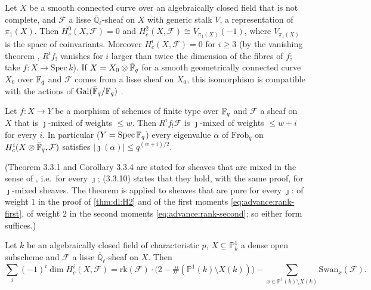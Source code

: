 \begin{theorem}\label{thm:prelim:curves}
Let $X$ be a smooth connected curve over an algebraically closed field that
is not complete, and $\mathcal F$ a lisse $\overline{\mathbb Q}_\ell$-sheaf on
$X$ with generic stalk $V$, a representation of $\pi_1(X)$. Then
$H^0_c(X,\mathcal F)=0$ and $H^2_c(X,\mathcal F)\cong V_{\pi_1(X)}(-1)$,
where $V_{\pi_1(X)}$ is the space of coinvariants. Moreover
$H^i_c(X,\mathcal F)=0$ for $i\ge3$ (by the vanishing theorem
\cite[Arcata, IV, Thm.~6.1]{SGA4half}, $R^if_!$ vanishes for $i$ larger than
twice the dimension of the fibres of $f$; take $f:X\to\mathrm{Spec}\,k$).
If $X=X_0\otimes\bar{\mathbb F}_q$ for a smooth geometrically connected curve $X_0$
over $\mathbb F_q$ and $\mathcal F$ comes from a lisse sheaf on $X_0$, this
isomorphism is compatible with the actions of $\mathrm{Gal}(\bar{\mathbb F}_q/\mathbb F_q)$
\cite[(1.4.2.3)]{DeligneWeilII}.
\end{theorem}

\begin{theorem}\label{thm:prelim:weights}
Let $f:X\to Y$ be a morphism of schemes of finite type over $\mathbb F_q$ and
$\mathcal F$ a sheaf on $X$ that is $\jmath$-mixed of weights $\le w$. Then
$R^if_!\mathcal F$ is $\jmath$-mixed of weights $\le w+i$ for every $i$. In
particular ($Y=\mathrm{Spec}\,\mathbb F_q$) every eigenvalue $\alpha$ of
$\mathrm{Frob}_q$ on $H^i_c(X\otimes\bar{\mathbb F}_q,\mathcal F)$ satisfies
$|\jmath(\alpha)|\le q^{(w+i)/2}$.
\end{theorem}

\noindent (Theorem 3.3.1 and Corollary 3.3.4 are stated for sheaves that are
mixed in the sense of \cite[(1.2.2)]{DeligneWeilII}, i.e.\ for every
$\jmath$; (3.3.10) states that they hold, with the same proof, for
$\jmath$-mixed sheaves. The theorem is applied to sheaves that are pure for
every $\jmath$: of weight $1$ in the proof of \cref{thm:dl:H2} and of the
first moments \eqref{eq:advance:rank-first}, of weight $2$ in the second
moments \eqref{eq:advance:rank-second}; so either form suffices.)

\begin{theorem}\label{thm:prelim:gos}
Let $k$ be an algebraically closed field of characteristic $p$,
$X\subseteq\mathbb P^1_k$ a dense open subscheme and $\mathcal F$ a lisse
$\overline{\mathbb Q}_\ell$-sheaf on $X$. Then
\[
  \sum_i(-1)^i\dim H^i_c(X,\mathcal F)
  =\mathrm{rk}(\mathcal F)\cdot\big(2-\#(\mathbb P^1(k)\setminus X(k))\big)
  -\sum_{x\in\mathbb P^1(k)\setminus X(k)}\mathrm{Swan}_x(\mathcal F).
\]
\end{theorem}

